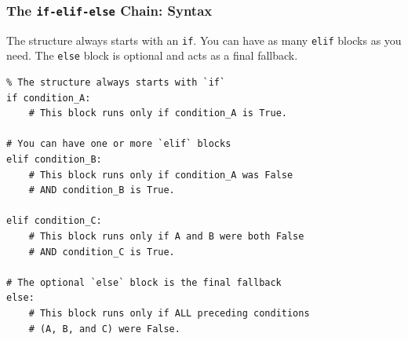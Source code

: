 \documentclass{beamer}
\begin{document}
\begin{frame}[fragile]
    \frametitle{The \texttt{if-elif-else} Chain: Syntax}
    
    The structure always starts with an \texttt{if}. You can have as many \texttt{elif} blocks as you need. The \texttt{else} block is optional and acts as a final fallback.
    
    \vspace{1em}
    
    \begin{verbatim}
% The structure always starts with `if`
if condition_A:
    # This block runs only if condition_A is True.

# You can have one or more `elif` blocks
elif condition_B:
    # This block runs only if condition_A was False
    # AND condition_B is True.

elif condition_C:
    # This block runs only if A and B were both False
    # AND condition_C is True.

# The optional `else` block is the final fallback
else:
    # This block runs only if ALL preceding conditions
    # (A, B, and C) were False.
    \end{verbatim}
    
\end{frame}
\end{document}
